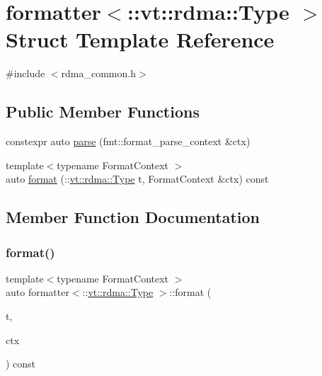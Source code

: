 \hypertarget{structformatter_3_1_1vt_1_1rdma_1_1_type_01_4}{}\section{formatter$<$\+:\+:vt\+:\+:rdma\+:\+:Type $>$ Struct Template Reference}
\label{structformatter_3_1_1vt_1_1rdma_1_1_type_01_4}


{\ttfamily \#include $<$rdma\+\_\+common.\+h$>$}

\subsection*{Public Member Functions}
\begin{DoxyCompactItemize}
\item 
constexpr auto \hyperlink{structformatter_3_1_1vt_1_1rdma_1_1_type_01_4_ae1f8eb96c0e31df9a0e50ea77522612f}{parse} (fmt\+::format\+\_\+parse\+\_\+context \&ctx)
\item 
{\footnotesize template$<$typename Format\+Context $>$ }\\auto \hyperlink{structformatter_3_1_1vt_1_1rdma_1_1_type_01_4_a3eb980b28f83d2deefad46eda7ab9c89}{format} (\+::\hyperlink{namespacevt_1_1rdma_ac848e1d9da43db6294bd06f83e5d3946}{vt\+::rdma\+::\+Type} t, Format\+Context \&ctx) const
\end{DoxyCompactItemize}


\subsection{Member Function Documentation}
\mbox{\label{structformatter_3_1_1vt_1_1rdma_1_1_type_01_4_a3eb980b28f83d2deefad46eda7ab9c89}} 
\subsubsection{\texorpdfstring{format()}{format()}}
{\footnotesize\ttfamily template$<$typename Format\+Context $>$ \\
auto formatter$<$\+::\hyperlink{namespacevt_1_1rdma_ac848e1d9da43db6294bd06f83e5d3946}{vt\+::rdma\+::\+Type} $>$\+::format (\begin{DoxyParamCaption}\item[{\+::\hyperlink{namespacevt_1_1rdma_ac848e1d9da43db6294bd06f83e5d3946}{vt\+::rdma\+::\+Type}}]{t,  }\item[{Format\+Context \&}]{ctx }\end{DoxyParamCaption}) const\hspace{0.3cm}{\ttfamily [inline]}}


